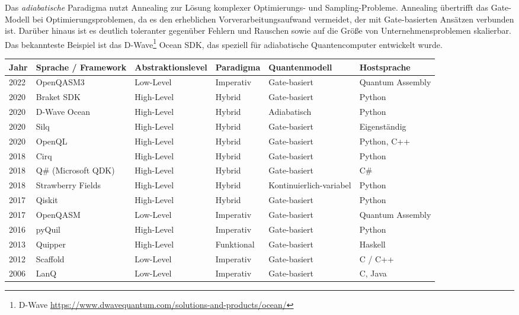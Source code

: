 Das \textit{adiabatische} Paradigma nutzt Annealing zur Lösung komplexer Optimierungs- und Sampling-Probleme. Annealing übertrifft das Gate-Modell bei Optimierungsproblemen, da es den erheblichen Vorverarbeitungsaufwand vermeidet, der mit Gate-basierten Ansätzen verbunden ist. Darüber hinaus ist es deutlich toleranter gegenüber Fehlern und Rauschen sowie auf die Größe von Unternehmensproblemen skalierbar. \autocite{albash_adiabatic_2018} Das bekannteste Beispiel ist das D-Wave\footnote{D-Wave \url{https://www.dwavequantum.com/solutions-and-products/ocean/}} Ocean SDK, das speziell für adiabatische Quantencomputer entwickelt wurde.

\begin{table}[ht!]
\centering
\footnotesize
\begin{tabularx}{\textwidth}{|l|p{2cm}|l|l|l|X|}
\hline
\textbf{Jahr} & 
\textbf{Sprache / Framework} & 
\textbf{Abstraktionslevel} & 
\textbf{Paradigma} & 
\textbf{Quantenmodell} & 
\textbf{Hostsprache} \\
\hline
2022 & OpenQASM3 & Low-Level & Imperativ & Gate-basiert & Quantum Assembly \\
\hline
2020 & Braket SDK & High-Level & Hybrid & Gate-basiert & Python \\
\hline
2020 & D-Wave Ocean & High-Level & Hybrid & Adiabatisch & Python \\
\hline
2020 & Silq & High-Level & Hybrid & Gate-basiert & Eigenständig \\
\hline
2020 & OpenQL & High-Level & Hybrid & Gate-basiert & Python, C++ \\
\hline
2018 & Cirq & High-Level & Hybrid & Gate-basiert & Python \\
\hline
2018 & Q\# (Microsoft QDK) & High-Level & Hybrid & Gate-basiert & C\# \\
\hline
2018 & Strawberry Fields & High-Level & Hybrid & Kontinuierlich-variabel & Python \\
\hline
2017 & Qiskit & High-Level & Hybrid & Gate-basiert & Python \\
\hline
2017 & OpenQASM & Low-Level & Imperativ &  Gate-basiert & Quantum Assembly \\
\hline
2016 & pyQuil & High-Level & Imperativ &  Gate-basiert & Python \\
\hline
2013 & Quipper & High-Level & Funktional & Gate-basiert & Haskell \\
\hline
2012 & Scaffold & Low-Level & Imperativ &  Gate-basiert & C / C++ \\
\hline
2006 & LanQ & Low-Level & Imperativ & Gate-basiert & C, Java \\

\end{tabularx}
\end{table}
